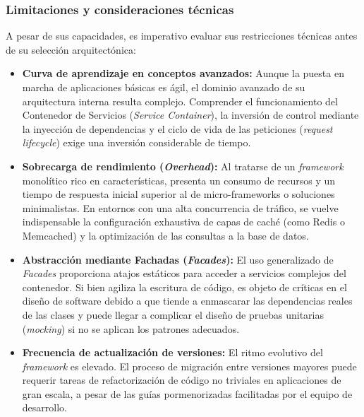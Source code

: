 \subsubsection{Limitaciones y consideraciones técnicas}



A pesar de sus capacidades, es imperativo evaluar sus restricciones técnicas antes de su selección arquitectónica:



\begin{itemize}

\item \textbf{Curva de aprendizaje en conceptos avanzados:} Aunque la puesta en marcha de aplicaciones básicas es ágil, el dominio avanzado de su arquitectura interna resulta complejo. Comprender el funcionamiento del Contenedor de Servicios (\textit{Service Container}), la inversión de control mediante la inyección de dependencias y el ciclo de vida de las peticiones (\textit{request lifecycle}) exige una inversión considerable de tiempo.


\item \textbf{Sobrecarga de rendimiento (\textit{Overhead}):} Al tratarse de un \textit{framework} monolítico rico en características, presenta un consumo de recursos y un tiempo de respuesta inicial superior al de micro-frameworks o soluciones minimalistas. En entornos con una alta concurrencia de tráfico, se vuelve indispensable la configuración exhaustiva de capas de caché (como Redis o Memcached) y la optimización de las consultas a la base de datos.


\item \textbf{Abstracción mediante Fachadas (\textit{Facades}):} El uso generalizado de \textit{Facades} proporciona atajos estáticos para acceder a servicios complejos del contenedor. Si bien agiliza la escritura de código, es objeto de críticas en el diseño de software debido a que tiende a enmascarar las dependencias reales de las clases y puede llegar a complicar el diseño de pruebas unitarias (\textit{mocking}) si no se aplican los patrones adecuados.


\item \textbf{Frecuencia de actualización de versiones:} El ritmo evolutivo del \textit{framework} es elevado. El proceso de migración entre versiones mayores puede requerir tareas de refactorización de código no triviales en aplicaciones de gran escala, a pesar de las guías pormenorizadas facilitadas por el equipo de desarrollo.

\end{itemize}


